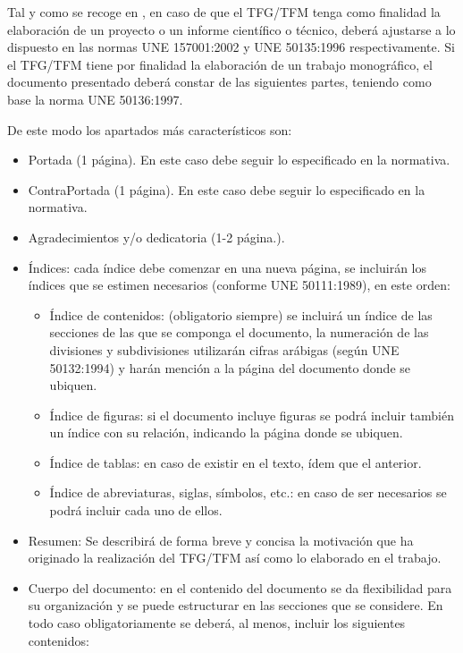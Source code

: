 \begin{list}
Tal y como se recoge en \cite{tfg_alicante}, en caso de que el TFG/TFM
tenga como finalidad la elaboración de un proyecto o un informe científico
o técnico, deberá ajustarse a lo dispuesto en las normas UNE 157001:2002\cite{une2002}
y UNE 50135:1996\cite{une96} respectivamente. Si el TFG/TFM tiene
por finalidad la elaboración de un trabajo monográfico, el documento
presentado deberá constar de las siguientes partes, teniendo como
base la norma UNE 50136:1997\cite{une97}. 

De este modo los apartados más característicos son:
\begin{itemize}
\item Portada (1 página). En este caso debe seguir lo especificado en la
normativa. 
\item ContraPortada (1 página). En este caso debe seguir lo especificado
en la normativa. 
\item Agradecimientos y/o dedicatoria (1-2 página.). 
\item Índices: cada índice debe comenzar en una nueva página, se incluirán
los índices que se estimen necesarios (conforme UNE 50111:1989\cite{une89}),
en este orden: 

\begin{itemize}
\item Índice de contenidos: (obligatorio siempre) se incluirá un índice
de las secciones de las que se componga el documento, la numeración
de las divisiones y subdivisiones utilizarán cifras arábigas (según
UNE 50132:1994\cite{une94}) y harán mención a la página del documento
donde se ubiquen. 
\item Índice de figuras: si el documento incluye figuras se podrá incluir
también un índice con su relación, indicando la página donde se ubiquen. 
\item Índice de tablas: en caso de existir en el texto, ídem que el anterior. 
\item Índice de abreviaturas, siglas, símbolos, etc.: en caso de ser necesarios
se podrá incluir cada uno de ellos. 
\end{itemize}
\item Resumen: Se describirá de forma breve y concisa la motivación que
ha originado la realización del TFG/TFM así como lo elaborado en el
trabajo. 
\item Cuerpo del documento: en el contenido del documento se da flexibilidad
para su organización y se puede estructurar en las secciones que se
considere. En todo caso obligatoriamente se deberá, al menos, incluir
los siguientes contenidos: 


\end{itemize}
\end{list}
